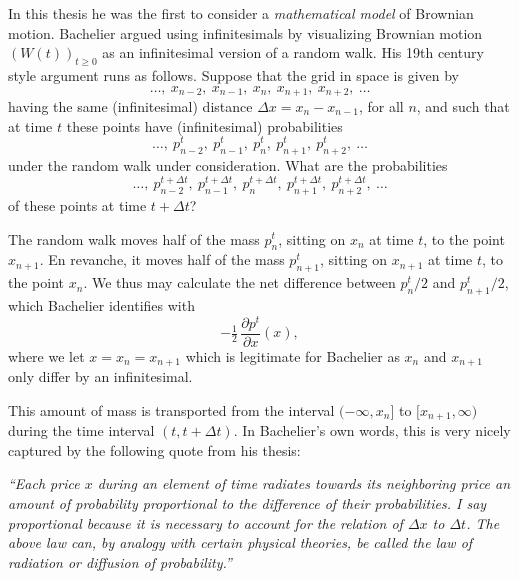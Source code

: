\documentclass[11pt,a4paper]{article}%
\numberwithin{equation}{section}
\begin{document}
In this thesis he was the first to consider a \textit{mathematical model} of Brownian motion. Bachelier argued using infinitesimals by visualizing Brownian motion $(W(t))_{t \geqslant 0}$ as an infinitesimal version of a random walk. His 19th century style argument runs as follows. Suppose that the grid in space is given by 
\begin{equation} \label{grid}
\ldots, \ x_{n-2}, \ x_{n-1}, \ x_{n}, \ x_{n+1}, \ x_{n+2}, \ \ldots
\end{equation}
having the same (infinitesimal) distance $\Delta x = x_{n}-x_{n-1}$, for all $n$, and such that at time $t$ these points have (infinitesimal) probabilities 
\begin{equation} \label{gridp}
\ldots, \ p_{n-2}^{t}, \ p_{n-1}^{t}, \ p_{n}^{t}, \ p_{n+1}^{t}, \ p_{n+2}^{t}, \ \ldots
\end{equation}
under the random walk under consideration. What are the probabilities 
\begin{equation} \label{gridpp}
\ldots, \ p_{n-2}^{t+\Delta t}, \ p_{n-1}^{t+\Delta t}, \ p_{n}^{t+\Delta t}, \ p_{n+1}^{t+\Delta t}, \ p_{n+2}^{t+\Delta t}, \ \ldots
\end{equation}
of these points at time $t+\Delta t$? 

The random walk moves half of the mass $p_{n}^{t}$, sitting on $x_{n}$ at time $t$, to the point $x_{n+1}$. En revanche, it moves half of the mass $p_{n+1}^{t}$, sitting on $x_{n+1}$ at time $t$, to the point $x_{n}$. We thus may calculate the net difference between $p_{n}^{t}/2$ and $p_{n+1}^{t}/2$, which Bachelier identifies with 
\begin{equation}
-\tfrac{1}{2} \, \frac{\partial p^{t}}{\partial x}(x), 
\end{equation}
where we let $x = x_n = x_{n+1}$ which is legitimate for Bachelier as $x_n$ and $x_{n+1}$ only differ by an infinitesimal.

This amount of mass is transported from the interval $(-\infty,x_{n}]$ to $[x_{n+1},\infty)$ during the time interval $ (t,t+\Delta t)$. In Bachelier's own words, this is very nicely captured by the following quote from his thesis: 

\medskip

\textit{``Each price $x$ during an element of time radiates towards its neighboring price an amount of probability proportional to the difference of their probabilities. I say proportional because it is necessary to account for the relation of $\Delta x$ to $\Delta t$. The above law can, by analogy with certain physical theories, be called the law of radiation or diffusion of probability.''}
\end{document}
